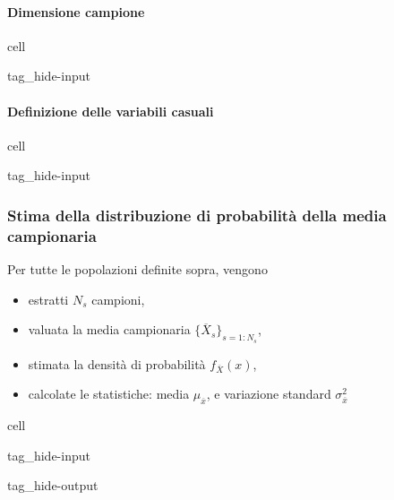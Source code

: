 \documentclass[letterpaper,10pt,italian]{jupyterBook}
\begin{document}
\paragraph{Dimensione campione}
\label{\detokenize{ch/statistics/iid:dimensione-campione}}
\begin{sphinxuseclass}{cell}
\begin{sphinxuseclass}{tag_hide-input}
\end{sphinxuseclass}
\end{sphinxuseclass}

\paragraph{Definizione delle variabili casuali}
\label{\detokenize{ch/statistics/iid:definizione-delle-variabili-casuali}}
\begin{sphinxuseclass}{cell}
\begin{sphinxuseclass}{tag_hide-input}
\end{sphinxuseclass}
\end{sphinxuseclass}

\subsubsection{Stima della distribuzione di probabilità della media campionaria}
\label{\detokenize{ch/statistics/iid:stima-della-distribuzione-di-probabilita-della-media-campionaria}}
\sphinxAtStartPar
Per tutte le popolazioni definite sopra, vengono
\begin{itemize}
\item {} 
\sphinxAtStartPar
estratti \(N_s\) campioni,

\item {} 
\sphinxAtStartPar
valuata la media campionaria \(\{\overline{X}_s\}_{s = 1:N_s}\),

\item {} 
\sphinxAtStartPar
stimata la densità di probabilità \(f_{\overline{X}}(x)\),

\item {} 
\sphinxAtStartPar
calcolate le statistiche: media \(\mu_{\overline{x}}\), e variazione standard \(\sigma_{\overline{x}}^2\)

\end{itemize}

\begin{sphinxuseclass}{cell}
\begin{sphinxuseclass}{tag_hide-input}
\begin{sphinxuseclass}{tag_hide-output}
\end{sphinxuseclass}
\end{sphinxuseclass}
\end{sphinxuseclass}
\end{document}
